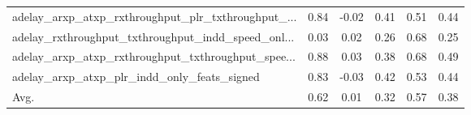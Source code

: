 \begin{tabular}{|l|*{4}{c}|r|}
adelay\_arxp\_atxp\_rxthroughput\_plr\_txthroughput\_... & 0.84 & -0.02 &    0.41 &       0.51 &  0.44 \\
adelay\_rxthroughput\_txthroughput\_indd\_speed\_onl... & 0.03 &  0.02 &    0.26 &       0.68 &  0.25 \\
adelay\_arxp\_atxp\_rxthroughput\_txthroughput\_spee... & 0.88 &  0.03 &    0.38 &       0.68 &  0.49 \\
adelay\_arxp\_atxp\_plr\_indd\_only\_feats\_signed        & 0.83 & -0.03 &    0.42 &       0.53 &  0.44 \\
\hline
Avg.                                               & 0.62 &  0.01 &    0.32 &       0.57 &  0.38 \\
\bottomrule
\end{tabular}
